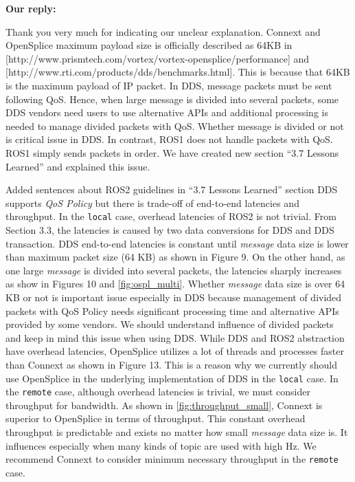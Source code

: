\documentclass{article}
\begin{document}
\begin{enumerate}
  \begin{flushleft}
    \textbf{Our reply:}
  \end{flushleft}
  Thank you very much for indicating our unclear explanation.
  Connext and OpenSplice maximum payload size is officially described as 64KB in [http://www.prismtech.com/vortex/vortex-opensplice/performance] and [http://www.rti.com/products/dds/benchmarks.html].
  This is because that 64KB is the maximum payload of IP packet.
  In DDS, message packets must be sent following QoS.
  Hence, when large message is divided into several packets, some DDS vendors need users to use alternative APIs and additional processing is needed to manage divided packets with QoS.
  Whether message is divided or not is critical issue in DDS.
  In contrast, ROS1 does not handle packets with QoS.
  ROS1 simply sends packets in order.
  We have created new section ``3.7 Lessons Learned'' and explained this issue.
  \begin{itembox}[|]{Added sentences about ROS2 guidelines in ``3.7 Lessons Learned'' section}
    DDS supports \emph{QoS Policy} but there is trade-off of end-to-end latencies and throughput.
    In the \texttt{local} case, overhead latencies of ROS2 is not trivial.
    From Section 3.3, the latencies is caused by two data conversions for DDS and DDS transaction.
    DDS end-to-end latencies is constant until \emph{message} data size is lower than maximum packet size (64 KB) as shown in Figure 9.
    On the other hand, as one large \emph{message} is divided into several packets, the latencies sharply increases as show in Figures 10 and \ref{fig:ospl_multi}.
    Whether \emph{message} data size is over 64 KB or not is important issue especially in DDS because management of divided packets with QoS Policy needs significant processing time and alternative APIs provided by some vendors.
    We should understand influence of divided packets and keep in mind this issue when using DDS.
    While DDS and ROS2 abstraction have overhead latencies, OpenSplice utilizes a lot of threads and processes faster than Connext as shown in Figure 13.
    This is a reason why we currently should use OpenSplice in the underlying implementation of DDS in the \texttt{local} case.
    In the \texttt{remote} case, although overhead latencies is trivial, we must consider throughput for bandwidth.
    As shown in \ref{fig:throughput_small}, Connext is superior to OpenSplice in terms of throughput.
    This constant overhead throughput is predictable and exists no matter how small \emph{message} data size is.
    It influences especially when many kinds of topic are used with high Hz.
    We recommend Connext to consider minimum necessary throughput in the \texttt{remote} case.
    

\end{itembox}
\end{enumerate}
\end{document}
